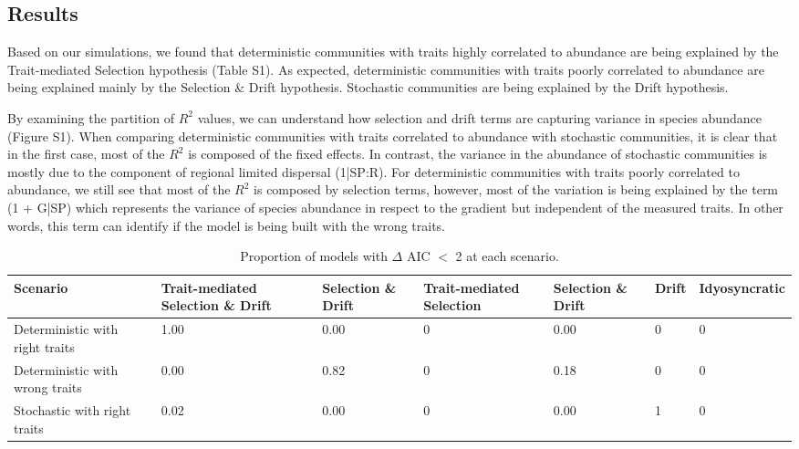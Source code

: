 \subsection*{Results}\label{results}

Based on our simulations, we found that deterministic communities with traits highly correlated to abundance are being explained by the Trait-mediated Selection hypothesis (Table S1). As expected, deterministic communities with traits poorly correlated to abundance are being explained mainly by the Selection \& Drift hypothesis. Stochastic communities are being explained by the Drift hypothesis.   

By examining the partition of $R^{2}$ values, we can understand how selection and drift terms are capturing variance in species abundance (Figure S1). When comparing deterministic communities with traits correlated to abundance with stochastic communities, it is clear that in the first case, most of the $R^{2}$ is composed of the fixed effects. In contrast, the variance in the abundance of stochastic communities is mostly due to the component of regional limited dispersal (1|SP:R). For deterministic communities with traits poorly correlated to abundance, we still see that most of the $R^{2}$ is composed by selection terms, however, most of the variation is being explained by the term (1 + G|SP) which represents the variance of species abundance in respect to the gradient but independent of the measured traits. In other words, this term can identify if the model is being built with the wrong traits. 

\begin{table}[!ht]

\caption{\label{tab:table-prop}Proportion of models with {$\Delta$} AIC {$<$}  2 at each scenario.}
\centering
\begin{tabular}[t]{p{3cm}p{2cm}p{}p{}p{2cm}p{2cm}p{2cm}}
\toprule
\textbf{Scenario} & \textbf{Trait-mediated Selection} \& \textbf{Drift} & \textbf{Selection \& Drift} & \textbf{Trait-mediated Selection} & \textbf{Selection \& Drift} & \textbf{Drift} & \textbf{Idyosyncratic}\\
\hline
Deterministic with right traits & 1.00 & 0.00 & 0 & 0.00 & 0 & 0\\
Deterministic with wrong traits & 0.00 & 0.82 & 0 & 0.18 & 0 & 0\\
Stochastic with right traits & 0.02 & 0.00 & 0 & 0.00 & 1 & 0\\
\bottomrule
\end{tabular}
\end{table}

